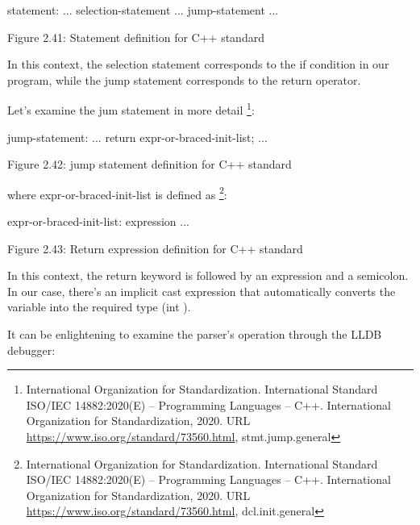 \begin{shell}
statement:
    ...
    selection-statement
    ...
    jump-statement
    ...
\end{shell}

\begin{center}
Figure 2.41: Statement definition for C++ standard
\end{center}

In this context, the selection statement corresponds to the if condition in our program, while the jump statement corresponds to the return operator.

Let's examine the jum statement in more detail \footnote{International Organization for Standardization. International Standard ISO/IEC 14882:2020(E) – Programming Languages – C++. International Organization for Standardization, 2020. URL \url{https://www.iso.org/standard/73560.html}, stmt.jump.general}:

\begin{shell}
jump-statement:
    ...
    return expr-or-braced-init-list;
    ...
\end{shell}

\begin{center}
Figure 2.42: jump statement definition for C++ standard
\end{center}

where expr-or-braced-init-list is defined as \footnote{International Organization for Standardization. International Standard ISO/IEC 14882:2020(E) – Programming Languages – C++. International Organization for Standardization, 2020. URL \url{https://www.iso.org/standard/73560.html}, dcl.init.general}:

\begin{shell}
expr-or-braced-init-list:
    expression
    ...
\end{shell}

\begin{center}
Figure 2.43: Return expression definition for C++ standard
\end{center}

In this context, the return keyword is followed by an expression and a semicolon. In our case, there's an implicit cast expression that automatically converts the variable into the required type (int ).

It can be enlightening to examine the parser's operation through the LLDB debugger:


